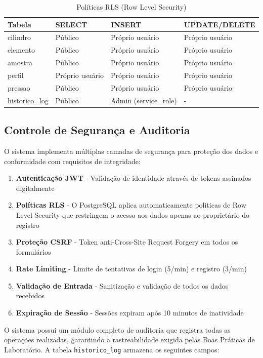 \documentclass[12pt,a4paper]{article}
\providecommand\关键字[1]{\textbf{#1}}
\begin{document}

\begin{table}[h!]
\centering
\caption{Políticas RLS (Row Level Security)}
\label{tab:rls}
\begin{tabular}{@{}llll@{}}
\toprule
\textbf{Tabela} & \textbf{SELECT} & \textbf{INSERT} & \textbf{UPDATE/DELETE} \\
\midrule
cilindro & Público & Próprio usuário & Próprio usuário \\
elemento & Público & Próprio usuário & Próprio usuário \\
amostra & Público & Próprio usuário & Próprio usuário \\
perfil & Próprio usuário & Próprio usuário & Próprio usuário \\
pressao & Público & Próprio usuário & Próprio usuário \\
historico\_log & Público & Admin (service\_role) & - \\
\bottomrule
\end{tabular}
\end{table}

\subsection{Controle de Segurança e Auditoria}

O sistema implementa múltiplas camadas de segurança para proteção dos dados e conformidade com requisitos de integridade:

\begin{enumerate}
\item \textbf{Autenticação JWT} - Validação de identidade através de tokens assinados digitalmente
\item \textbf{Políticas RLS} - O PostgreSQL aplica automaticamente políticas de Row Level Security que restringem o acesso aos dados apenas ao proprietário do registro
\item \textbf{Proteção CSRF} - Token anti-Cross-Site Request Forgery em todos os formulários
\item \textbf{Rate Limiting} - Limite de tentativas de login (5/min) e registro (3/min)
\item \textbf{Validação de Entrada} - Sanitização e validação de todos os dados recebidos
\item \textbf{Expiração de Sessão} - Sessões expiram após 10 minutos de inatividade
\end{enumerate}

O sistema possui um módulo completo de auditoria que registra todas as operações realizadas, garantindo a rastreabilidade exigida pelas Boas Práticas de Laboratório. A tabela \texttt{historico\_log} armazena os seguintes campos:
\end{document}
